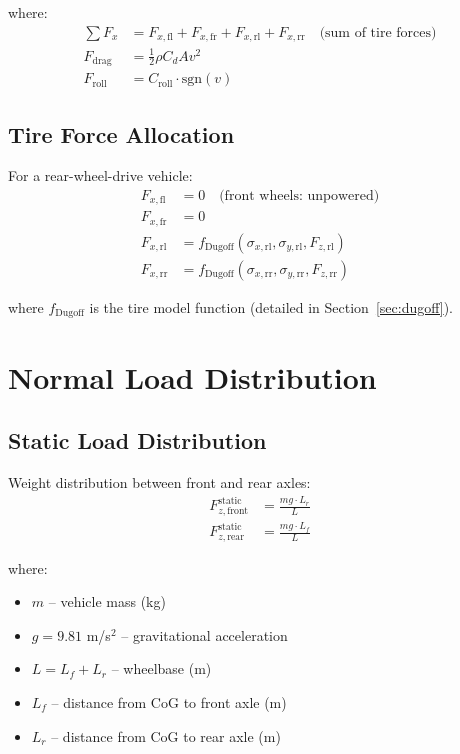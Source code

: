\documentclass[11pt,a4paper]{article}
\begin{document}
where:
\begin{align}
\sum F_x &= F_{x,\text{fl}} + F_{x,\text{fr}} + F_{x,\text{rl}} + F_{x,\text{rr}} \quad \text{(sum of tire forces)} \\
F_{\text{drag}} &= \frac{1}{2} \rho C_d A v^2 \\
F_{\text{roll}} &= C_{\text{roll}} \cdot \text{sgn}(v)
\end{align}

\subsection{Tire Force Allocation}

For a rear-wheel-drive vehicle:
\begin{align}
F_{x,\text{fl}} &= 0 \quad \text{(front wheels: unpowered)} \\
F_{x,\text{fr}} &= 0 \\
F_{x,\text{rl}} &= f_{\text{Dugoff}}(\sigma_{x,\text{rl}}, \sigma_{y,\text{rl}}, F_{z,\text{rl}}) \\
F_{x,\text{rr}} &= f_{\text{Dugoff}}(\sigma_{x,\text{rr}}, \sigma_{y,\text{rr}}, F_{z,\text{rr}})
\end{align}

where $f_{\text{Dugoff}}$ is the tire model function (detailed in Section~\ref{sec:dugoff}).

\section{Normal Load Distribution}

\subsection{Static Load Distribution}

Weight distribution between front and rear axles:
\begin{align}
F_{z,\text{front}}^{\text{static}} &= \frac{mg \cdot L_r}{L} \\
F_{z,\text{rear}}^{\text{static}} &= \frac{mg \cdot L_f}{L}
\end{align}

where:
\begin{itemize}
    \item $m$ -- vehicle mass (kg)
    \item $g = 9.81$ m/s$^2$ -- gravitational acceleration
    \item $L = L_f + L_r$ -- wheelbase (m)
    \item $L_f$ -- distance from CoG to front axle (m)
    \item $L_r$ -- distance from CoG to rear axle (m)
\end{itemize}
\end{document}
